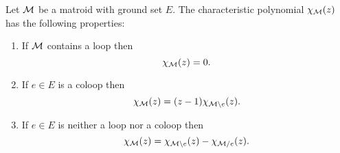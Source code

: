\documentclass[12pt,oneside]{../../sfsuthesis}
\begin{document}
\begin{proposition}\th\label{thm:charPolyProps}

    Let \( \mathcal{M} \) be a matroid with ground set \( E \).
    The characteristic polynomial \( \chi_{\mathcal{M}}(z) \) has the following properties:
    \begin{enumerate}[label=\((\chi\arabic*)\)]
        \item If \( \mathcal{M} \) contains a loop then
              \[
                  \chi_{\mathcal{M}}(z) = 0.
              \]\label{prop:chi1}
        \item If \( e \in E \) is a coloop then
              \[
                  \chi_{\mathcal{M}}(z) = (z - 1)\chi_{\mathcal{M} \setminus e}(z).
              \]\label{prop:chi2}
        \item If \( e \in E \) is neither a loop nor a coloop then
              \[
                  \chi_{\mathcal{M}}(z) = \chi_{\mathcal{M} \setminus e}(z) - \chi_{\mathcal{M} / e}(z).
              \]\label{prop:chi3}
    \end{enumerate}
\end{proposition}
\end{document}
